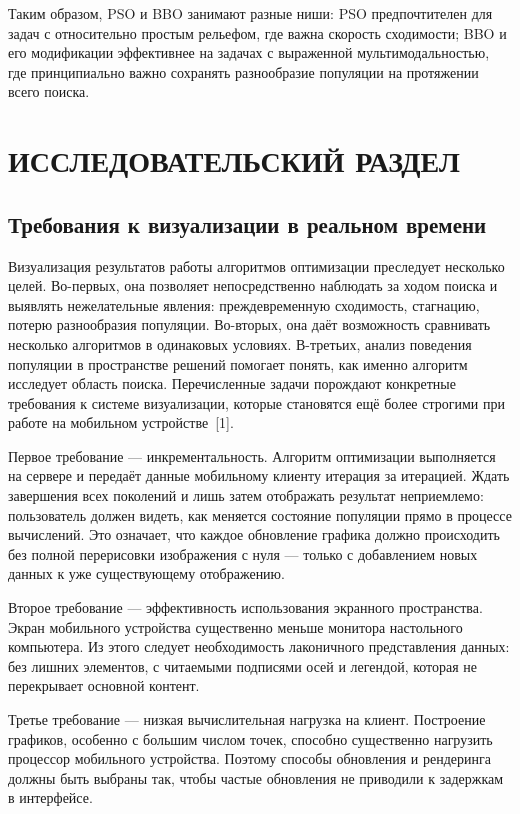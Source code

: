 \documentclass[14pt, russian]{scrartcl}
\begin{document}
Таким образом, PSO и BBO занимают разные ниши: PSO предпочтителен для
задач с относительно простым рельефом, где важна скорость сходимости;
BBO и его модификации эффективнее на задачах с выраженной
мультимодальностью, где принципиально важно сохранять разнообразие
популяции на протяжении всего поиска.


\section{ИССЛЕДОВАТЕЛЬСКИЙ РАЗДЕЛ}

\subsection{Требования к визуализации в реальном времени}

Визуализация результатов работы алгоритмов оптимизации преследует
несколько целей. Во-первых, она позволяет непосредственно наблюдать за
ходом поиска и выявлять нежелательные явления: преждевременную
сходимость, стагнацию, потерю разнообразия популяции. Во-вторых, она
даёт возможность сравнивать несколько алгоритмов в одинаковых условиях.
В-третьих, анализ поведения популяции в пространстве решений помогает
понять, как именно алгоритм исследует область поиска. Перечисленные
задачи порождают конкретные требования к системе визуализации, которые
становятся ещё более строгими при работе на мобильном устройстве~[1].

Первое требование --- инкрементальность. Алгоритм оптимизации выполняется
на сервере и передаёт данные мобильному клиенту итерация за итерацией.
Ждать завершения всех поколений и лишь затем отображать результат
неприемлемо: пользователь должен видеть, как меняется состояние
популяции прямо в процессе вычислений. Это означает, что каждое
обновление графика должно происходить без полной перерисовки
изображения с нуля --- только с добавлением новых данных к уже
существующему отображению.

Второе требование --- эффективность использования экранного пространства.
Экран мобильного устройства существенно меньше монитора настольного
компьютера. Из этого следует необходимость лаконичного представления
данных: без лишних элементов, с читаемыми подписями осей и легендой,
которая не перекрывает основной контент.

Третье требование --- низкая вычислительная нагрузка на клиент.
Построение графиков, особенно с большим числом точек, способно
существенно нагрузить процессор мобильного устройства. Поэтому способы
обновления и рендеринга должны быть выбраны так, чтобы частые
обновления не приводили к задержкам в интерфейсе.
\end{document}

